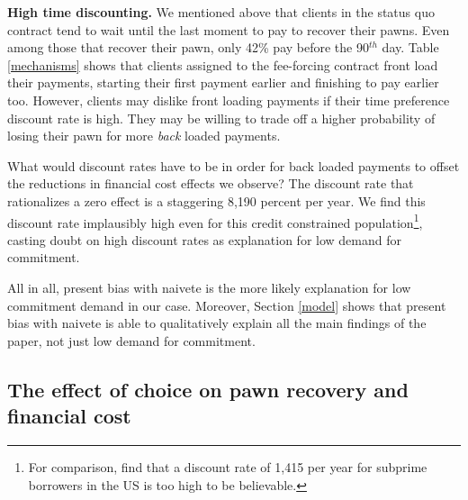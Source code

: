 \documentclass[oneside,11pt]{article}
\begin{document}
\vspace{.1in}
\noindent \textbf{High time discounting.} We mentioned above that clients in the status quo contract tend to wait until the last moment to pay to recover their pawns. Even among those that recover their pawn, only 42\% pay before the 90$^{th}$ day. Table \ref{mechanisms} shows that clients assigned to the fee-forcing contract front load their payments, starting their first payment earlier and finishing to pay earlier too. However, clients may dislike front loading payments if their time preference discount rate is high. They may be willing to trade off a higher probability of losing their pawn for more \textit{back} loaded payments.  

What would discount rates have to be in order for back loaded payments to offset the reductions in financial cost effects we observe? %
The discount rate that rationalizes a zero effect is a staggering 8,190 percent per year. We find this discount rate implausibly high even for this credit constrained population\footnote{For comparison, \cite{Levin} find that a discount rate of 1,415 per year for subprime borrowers in the US is too high to be believable.}, casting doubt on high discount rates as explanation for low demand for commitment. %

\vspace{.2in}
\noindent All in all, present bias with naivete is the more likely explanation for low commitment demand in our case. Moreover, Section \ref{model} shows that present bias with naivete is able to qualitatively explain all the main findings of the paper, not just low demand for commitment.


\subsection{The effect of choice on pawn recovery and financial cost} \label{effect_choice}
\end{document}
